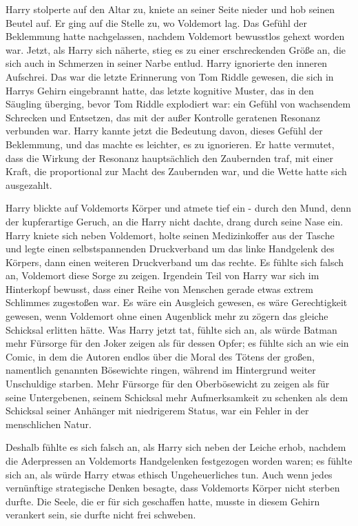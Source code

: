 Harry stolperte auf den Altar zu, kniete an seiner Seite nieder und hob seinen
Beutel auf. Er ging auf die Stelle zu, wo Voldemort lag. Das Gefühl der
Beklemmung hatte nachgelassen, nachdem Voldemort bewusstlos gehext worden war.
Jetzt, als Harry sich näherte, stieg es zu einer erschreckenden Größe an, die
sich auch in Schmerzen in seiner Narbe entlud. Harry ignorierte den inneren
Aufschrei. Das war die letzte Erinnerung von Tom Riddle gewesen, die sich in
Harrys Gehirn eingebrannt hatte, das letzte kognitive Muster, das in den
Säugling überging, bevor Tom Riddle explodiert war: ein Gefühl von wachsendem
Schrecken und Entsetzen, das mit der außer Kontrolle geratenen Resonanz
verbunden war. Harry kannte jetzt die Bedeutung davon, dieses Gefühl der
Beklemmung, und das machte es leichter, es zu ignorieren. Er hatte vermutet,
dass die Wirkung der Resonanz hauptsächlich den Zaubernden traf, mit einer
Kraft, die proportional zur Macht des Zaubernden war, und die Wette hatte sich
ausgezahlt.

Harry blickte auf Voldemorts Körper und atmete tief ein - durch den Mund, denn
der kupferartige Geruch, an die Harry nicht dachte, drang durch seine Nase ein.
Harry kniete sich neben Voldemort, holte seinen Medizinkoffer aus der Tasche und
legte einen selbstspannenden Druckverband um das linke Handgelenk des Körpers,
dann einen weiteren Druckverband um das rechte. Es fühlte sich falsch an,
Voldemort diese Sorge zu zeigen. Irgendein Teil von Harry war sich im Hinterkopf
bewusst, dass einer Reihe von Menschen gerade etwas extrem Schlimmes zugestoßen
war. Es wäre ein Ausgleich gewesen, es wäre Gerechtigkeit gewesen, wenn
Voldemort ohne einen Augenblick mehr zu zögern das gleiche Schicksal erlitten
hätte. Was Harry jetzt tat, fühlte sich an, als würde Batman mehr Fürsorge für
den Joker zeigen als für dessen Opfer; es fühlte sich an wie ein Comic, in dem
die Autoren endlos über die Moral des Tötens der großen, namentlich genannten
Bösewichte ringen, während im Hintergrund weiter Unschuldige starben. Mehr
Fürsorge für den Oberbösewicht zu zeigen als für seine Untergebenen, seinem
Schicksal mehr Aufmerksamkeit zu schenken als dem Schicksal seiner Anhänger mit
niedrigerem Status, war ein Fehler in der menschlichen Natur.

Deshalb fühlte es sich falsch an, als Harry sich neben der Leiche erhob, nachdem
die Aderpressen an Voldemorts Handgelenken festgezogen worden waren; es fühlte
sich an, als würde Harry etwas ethisch Ungeheuerliches tun. Auch wenn jedes
vernünftige strategische Denken besagte, dass Voldemorts Körper nicht sterben
durfte. Die Seele, die er für sich geschaffen hatte, musste in diesem Gehirn
verankert sein, sie durfte nicht frei schweben.

